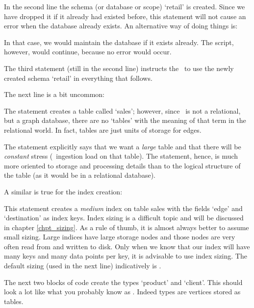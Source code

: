 In the second line the schema
(or database or scope) `retail'
is created. Since we have dropped it
if it already had existed before,
this statement will not cause
an error when the database already exists.
An alternative way of doing things is:


In that case, we would maintain the database
if it exists already. The script, however,
would continue, because no error would occur.

The third statement (still in the second line)
instructs the \nowdb\ to use the newly created
schema `retail' in everything that follows.

The next line is a bit uncommon:


The statement creates a table called `sales';
however, since \nowdb\ is not a relational,
but a graph database, there are no 
`tables' with the meaning of that term
in the relational world.
In fact, tables are just units of storage 
for edges. 

The statement explicitly says that we
want a \emph{large} table and that there
will be \emph{constant} stress (\ie\ ingestion load
on that table). The  statement,
hence, is much more oriented to storage
and processing details than to the logical structure
of the table (as it would be in a relational database).

A similar is true for the index creation:


This statement creates a \emph{medium} index on table sales
with the fields `edge' and `destination' as index keys.
Index sizing is a difficult topic and will be discussed
in chapter \ref{chpt_sizing}.
As a rule of thumb, it is almost always better to assume
small sizing. Large indices have large storage nodes
and those nodes are very often read from and written
to disk. Only when we know that our index will have
many keys and many data points per key, it is advisable
to use index sizing. The default sizing (used in the next
line) indicatively is .

The next two blocks of code create the types
`product' and `client'. This should look a lot like
what you probably know as . Indeed types
are vertices stored as  tables.

